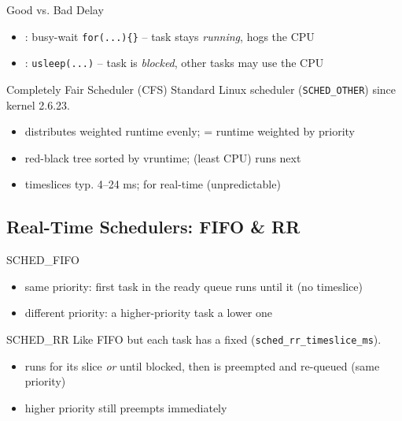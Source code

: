 \begin{definition}{Good vs. Bad Delay}
    \begin{itemize}
        \item {}: busy-wait \texttt{for(...)\{\}} -- task stays
              \emph{running}, hogs the CPU
        \item {}: \texttt{usleep(...)} -- task is \emph{blocked}, other
              tasks may use the CPU
    \end{itemize}
\end{definition}

\multend

\begin{concept}{Completely Fair Scheduler (CFS)}
    Standard Linux scheduler (\texttt{SCHED\_OTHER}) since kernel 2.6.23.
    \begin{itemize}
        \item distributes weighted runtime evenly;  = runtime
              weighted by priority
        \item red-black tree sorted by vruntime;  (least CPU) runs next
        \item timeslices typ. 4--24 ms;  for real-time (unpredictable)
    \end{itemize}
\end{concept}

\subsection{Real-Time Schedulers: FIFO \& RR}


\begin{definition}{SCHED\_FIFO}
    \begin{itemize}
        \item same priority: first task in the ready queue runs until it
               (no timeslice)
        \item different priority: a higher-priority task  a lower one
    \end{itemize}
\end{definition}

\begin{definition}{SCHED\_RR}
    Like FIFO but each task has a fixed 
    (\texttt{sched\_rr\_timeslice\_ms}).
    \begin{itemize}
        \item runs for its slice \emph{or} until blocked, then is preempted and
              re-queued (same priority)
        \item higher priority still preempts immediately
    \end{itemize}
\end{definition}

